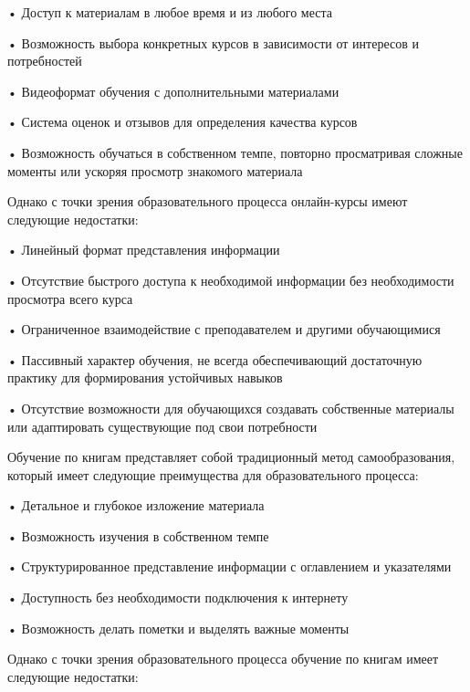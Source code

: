 {  \par \redline • Доступ к материалам в любое время и из любого места
  \par \redline • Возможность выбора конкретных курсов в зависимости от интересов и потребностей
  \par \redline • Видеоформат обучения с дополнительными материалами
  \par \redline • Система оценок и отзывов для определения качества курсов
  \par \redline • Возможность обучаться в собственном темпе, повторно просматривая сложные моменты или ускоряя просмотр знакомого материала
  
  \par \redline Однако с точки зрения образовательного процесса онлайн-курсы имеют следующие недостатки:
  
  \par \redline • Линейный формат представления информации
  \par \redline • Отсутствие быстрого доступа к необходимой информации без необходимости просмотра всего курса
  \par \redline • Ограниченное взаимодействие с преподавателем и другими обучающимися
  \par \redline • Пассивный характер обучения, не всегда обеспечивающий достаточную практику для формирования устойчивых навыков
  \par \redline • Отсутствие возможности для обучающихся создавать собственные материалы или адаптировать существующие под свои потребности

  \par \redline Обучение по книгам представляет собой традиционный метод самообразования, который имеет следующие преимущества для образовательного процесса:
  
  \par \redline • Детальное и глубокое изложение материала
  \par \redline • Возможность изучения в собственном темпе
  \par \redline • Структурированное представление информации с оглавлением и указателями
  \par \redline • Доступность без необходимости подключения к интернету
  \par \redline • Возможность делать пометки и выделять важные моменты
  
  \par \redline Однако с точки зрения образовательного процесса обучение по книгам имеет следующие недостатки:
  
}
